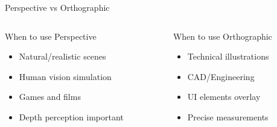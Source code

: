 \begin{frame}{Perspective vs Orthographic}
    \vspace{0.5cm}
    \begin{columns}
        \begin{column}{0.5\textwidth}
            \begin{raybox}{When to use Perspective}
                \begin{itemize}
                    \item Natural/realistic scenes
                    \item Human vision simulation
                    \item Games and films
                    \item Depth perception important
                \end{itemize}
            \end{raybox}
        \end{column}
        \begin{column}{0.5\textwidth}
            \begin{raybox}{When to use Orthographic}
                \begin{itemize}
                    \item Technical illustrations
                    \item CAD/Engineering
                    \item UI elements overlay
                    \item Precise measurements
                \end{itemize}
            \end{raybox}
        \end{column}
    \end{columns}
\end{frame}

